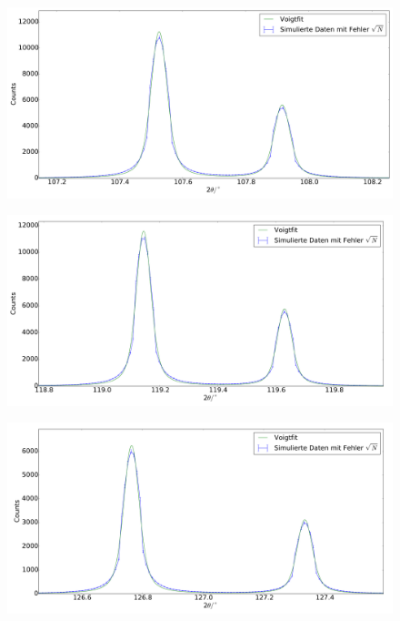 \begin{figure}[H]
\begin{minipage}{.5\textwidth}
  \centering
  \includegraphics[scale=0.15]{Simulation_Germaniumpulver_9}
  \label{fig:pul_sim_ger_9}
\end{minipage}
\hspace{0.5cm}
\begin{minipage}{.5\textwidth}
  \centering
  \includegraphics[scale=0.15]{Simulation_Germaniumpulver_10}
  \label{fig:pul_sim_ger_10}
\end{minipage}
\end{figure}
\begin{figure}[H]
\begin{minipage}{.5\textwidth}
  \centering
  \includegraphics[scale=0.15]{Simulation_Germaniumpulver_11}
  \label{fig:pul_sim_ger_11}
\end{minipage}
\end{figure}
